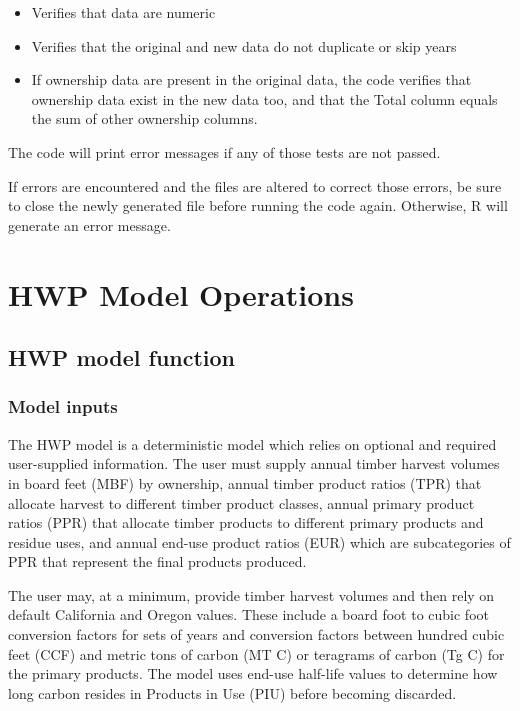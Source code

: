 \documentclass[
  openany]{book}
\begin{document}
\begin{itemize}
\item
  Verifies that data are numeric
\item
  Verifies that the original and new data do not duplicate or skip years
\item
  If ownership data are present in the original data, the code verifies that ownership data exist in the new data too, and that the Total column equals the sum of other ownership columns.
\end{itemize}

The code will print error messages if any of those tests are not passed.

If errors are encountered and the files are altered to correct those errors, be sure to close the newly generated file before running the code again. Otherwise, R will generate an error message.

\hypertarget{model}{%
\chapter{HWP Model Operations}\label{model}}

\hypertarget{model-func}{%
\section{HWP model function}\label{model-func}}

\hypertarget{model-func-inp}{%
\subsection{Model inputs}\label{model-func-inp}}

The HWP model is a deterministic model which relies on optional and required user-supplied information. The user must supply annual timber harvest volumes in board feet (MBF) by ownership, annual timber product ratios (TPR) that allocate harvest to different timber product classes, annual primary product ratios (PPR) that allocate timber products to different primary products and residue uses, and annual end-use product ratios (EUR) which are subcategories of PPR that represent the final products produced.

The user may, at a minimum, provide timber harvest volumes and then rely on default California and Oregon values. These include a board foot to cubic foot conversion factors for sets of years and conversion factors between hundred cubic feet (CCF) and metric tons of carbon (MT C) or teragrams of carbon (Tg C) for the primary products. The model uses end-use half-life values to determine how long carbon resides in Products in Use (PIU) before becoming discarded.
\end{document}
